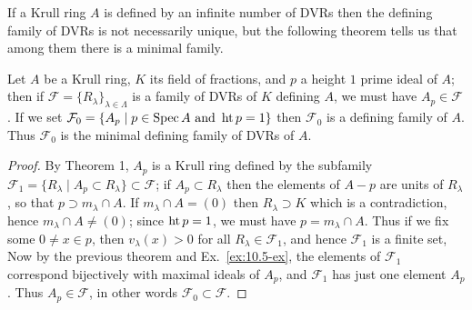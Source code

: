 If a Krull ring $A$ is defined by an infinite number of DVRs then the
defining family of DVRs is not necessarily unique, but the following
theorem tells us that among them there is a minimal family.

\begin{theorem}\label{thm:12.3}
Let $A$ be a Krull ring, $K$ its field of fractions, and $p$ a height $1$
prime ideal of $A$; then if $\mathcal{F} = \{R_\lambda\}_{\lambda \in \Lambda}$ is a family of DVRs of $K$ defining $A$, we
must have $A_p \in \mathcal{F}$. If we set $\mathcal{F}_0 = \{A_p \mid p \in \operatorname{Spec} A \text{ and } \operatorname{ht} p = 1\}$ then $\mathcal{F}_0$ is a
defining family of $A$. Thus $\mathcal{F}_0$ is the minimal defining family of DVRs of $A$.
\end{theorem}

\begin{proof}
By Theorem 1, $A_p$ is a Krull ring defined by the subfamily $\mathcal{F}_1 =
\{R_\lambda \mid A_p \subset R_\lambda\} \subset \mathcal{F}$; if $A_p \subset R_\lambda$ then the elements of $A - p$ are units of $R_\lambda$,
so that $p \supset m_\lambda \cap A$. If $m_\lambda \cap A = (0)$ then $R_\lambda \supset K$ which is a contradiction,
hence $m_\lambda \cap A \neq (0)$; since $\operatorname{ht} p = 1$, we must have $p = m_\lambda \cap A$. Thus if we fix
some $0 \neq x \in p$, then $v_\lambda(x) > 0$ for all $R_\lambda \in \mathcal{F}_1$, and hence $\mathcal{F}_1$ is a finite set,
Now by the previous theorem and Ex.~\ref{ex:10.5-ex}, the elements of $\mathcal{F}_1$ correspond
bijectively with maximal ideals of $A_p$, and $\mathcal{F}_1$ has just one element $A_p$. Thus
$A_p \in \mathcal{F}$, in other words $\mathcal{F}_0 \subset \mathcal{F}$.


\end{proof}
